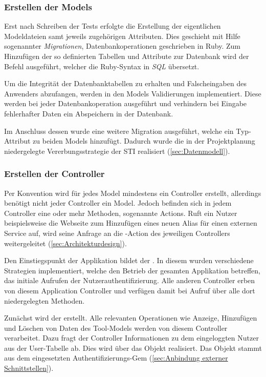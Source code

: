 \subsubsection{Erstellen der Models}
\label{sec:Erstellen der Models}
Erst nach Schreiben der Tests erfolgte die Erstellung der eigentlichen Modeldateien samt jeweils
zugehörigen Attributen. Dies geschieht mit Hilfe sogenannter \textit{Migrationen},
Datenbankoperationen geschrieben in Ruby. Zum Hinzufügen der so definierten Tabellen und Attribute
zur Datenbank wird der Befehl  ausgeführt, welcher die Ruby-Syntax in
\textit{\acs{SQL}} übersetzt.

Um die Integrität der Datenbanktabellen zu erhalten und \ggfs Falscheingaben des Anwenders abzufangen,
werden in den Models Validierungen implementiert. Diese werden bei jeder Datenbankoperation
ausgeführt und verhindern bei Eingabe fehlerhafter Daten ein Abspeichern in der Datenbank.


Im Anschluss dessen wurde eine weitere Migration ausgeführt, welche ein Typ-Attribut zu
beiden Models hinzufügt. Dadurch wurde die in der Projektplanung niedergelegte Vererbungsstrategie
der \acs{STI} realisiert (\Vgl \ref{sec:Datenmodell}).

\subsubsection{Erstellen der Controller}
\label{sec:Erstellen der Controller}
Per Konvention wird für jedes Model mindestens ein Controller erstellt, allerdings benötigt nicht jeder
Controller ein Model. Jedoch befinden sich in jedem Controller eine oder mehr Methoden, sogenannte
Actions. Ruft ein Nutzer beispielsweise die Webseite zum Hinzufügen eines neuen Alias für einen
externen Service auf, wird seine Anfrage an die -Action des jeweiligen Controllers weitergeleitet
(\Vgl \ref{sec:Architekturdesign}).

Den Einstiegspunkt der Applikation bildet der . In diesem wurden
verschiedene Strategien implementiert, welche den Betrieb der gesamten Applikation betreffen,
\bspw das initiale Aufrufen der Nutzerauthentifizierung. Alle anderen Controller erben von diesem
Application Controller und verfügen damit bei Aufruf über alle dort niedergelegten Methoden.

Zunächst wird der  erstellt. Alle relevanten Operationen
wie Anzeige, Hinzufügen und Löschen von Daten des Tool-Models werden von diesem Controller
verarbeitet. Dazu fragt der Controller Informationen zu dem eingeloggten Nutzer aus der User-Tabelle
ab. Dies wird über das Objekt  realisiert. Das Objekt stammt aus dem
eingesetzten Authentifizierungs-Gem  (\Vgl \ref{sec:Anbindung externer Schnittstellen}).

